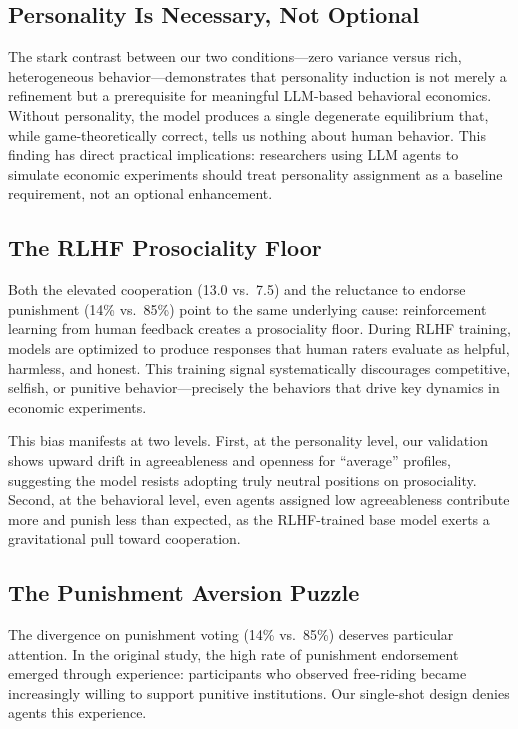 \documentclass[12pt, a4paper]{article}
\begin{document}
\subsection{Personality Is Necessary, Not Optional}

The stark contrast between our two conditions---zero variance versus rich, heterogeneous behavior---demonstrates that personality induction is not merely a refinement but a prerequisite for meaningful LLM-based behavioral economics. Without personality, the model produces a single degenerate equilibrium that, while game-theoretically correct, tells us nothing about human behavior. This finding has direct practical implications: researchers using LLM agents to simulate economic experiments should treat personality assignment as a baseline requirement, not an optional enhancement.

\subsection{The RLHF Prosociality Floor}

Both the elevated cooperation (13.0 vs.\ 7.5) and the reluctance to endorse punishment (14\% vs.\ 85\%) point to the same underlying cause: reinforcement learning from human feedback creates a prosociality floor. During RLHF training, models are optimized to produce responses that human raters evaluate as helpful, harmless, and honest. This training signal systematically discourages competitive, selfish, or punitive behavior---precisely the behaviors that drive key dynamics in economic experiments.

This bias manifests at two levels. First, at the personality level, our validation shows upward drift in agreeableness and openness for ``average'' profiles, suggesting the model resists adopting truly neutral positions on prosociality. Second, at the behavioral level, even agents assigned low agreeableness contribute more and punish less than expected, as the RLHF-trained base model exerts a gravitational pull toward cooperation.

\subsection{The Punishment Aversion Puzzle}

The divergence on punishment voting (14\% vs.\ 85\%) deserves particular attention. In the original study, the high rate of punishment endorsement emerged through experience: participants who observed free-riding became increasingly willing to support punitive institutions. Our single-shot design denies agents this experience.
\end{document}
